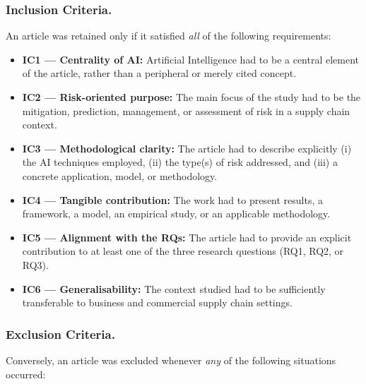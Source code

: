 \subsubsection{Inclusion Criteria.}
An article was retained only if it satisfied \textit{all} of the following requirements:

\begin{itemize}
    \item \textbf{IC1 --- Centrality of AI:} Artificial Intelligence had to be a central element of the article, rather than a peripheral or merely cited concept.
    \item \textbf{IC2 --- Risk-oriented purpose:} The main focus of the study had to be the mitigation, prediction, management, or assessment of risk in a supply chain context.
    \item \textbf{IC3 --- Methodological clarity:} The article had to describe explicitly (i) the AI techniques employed, (ii) the type(s) of risk addressed, and (iii) a concrete application, model, or methodology.
    \item \textbf{IC4 --- Tangible contribution:} The work had to present results, a framework, a model, an empirical study, or an applicable methodology.
    \item \textbf{IC5 --- Alignment with the RQs:} The article had to provide an explicit contribution to at least one of the three research questions (RQ1, RQ2, or RQ3).
    \item \textbf{IC6 --- Generalisability:} The context studied had to be sufficiently transferable to business and commercial supply chain settings.
\end{itemize}

\subsubsection{Exclusion Criteria.}
Conversely, an article was excluded whenever \textit{any} of the following situations occurred:

